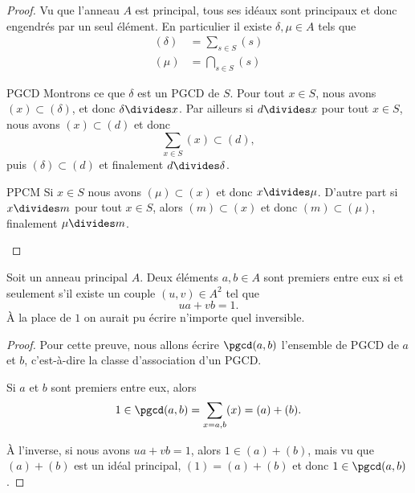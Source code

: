 \begin{proof}
    Vu que l'anneau \( A\) est principal, tous ses idéaux sont principaux et donc engendrés par un seul élément. En particulier il existe \( \delta,\mu\in A\) tels que
    \begin{subequations}
        \begin{align}
            (\delta)&=\sum_{s\in S}(s)\\
            (\mu)&=\bigcap_{s\in S}(s)
        \end{align}
    \end{subequations}
    \begin{subproof}
    \item[PGCD]
        Montrons ce que \( \delta\) est un PGCD de \( S\). Pour tout \( x\in S\), nous avons \( (x)\subset (\delta)\), et donc \( \delta\divides x\). Par ailleurs si \( d\divides x\) pour tout \( x\in S\), nous avons \( (x)\subset (d)\) et donc
        \begin{equation}
            \sum_{x\in S}(x)\subset (d),
        \end{equation}
        puis \( (\delta)\subset (d)\) et finalement \( d\divides \delta\).
        \item[PPCM]
            Si \( x\in S\) nous avons \( (\mu)\subset (x)\) et donc \( x\divides \mu\). D'autre part si \( x\divides m\) pour tout \( x\in S\), alors \( (m)\subset (x)\) et donc \( (m)\subset(\mu)\), finalement \( \mu\divides m\).
    \end{subproof}
\end{proof}

\begin{corollary}\label{CorimHyXy}
    Soit un anneau principal \( A\). Deux éléments \( a,b\in A\) sont premiers entre eux si et seulement s'il existe un couple \( (u, v)\in A^2 \) tel que
    \begin{equation}
        ua+vb=1.
    \end{equation}
    À la place de \( 1\) on aurait pu écrire n'importe quel inversible.
\end{corollary}

\begin{proof}
    Pour cette preuve, nous allons écrire \( \pgcd(a,b)\) l'ensemble de PGCD de \( a\) et \( b\), c'est-à-dire la classe d'association d'un PGCD.

    Si \( a\) et \( b\) sont premiers entre eux, alors
    \begin{equation}
        1\in\pgcd(a,b)=\sum_{x=a,b}(x)=(a)+(b).
    \end{equation}

    À l'inverse, si nous avons \( ua+vb=1\), alors \( 1\in (a)+(b)\), mais vu que \( (a)+(b)\) est un idéal principal, \( (1)=(a)+(b)\) et donc \( 1\in \pgcd(a,b)\).
\end{proof}

